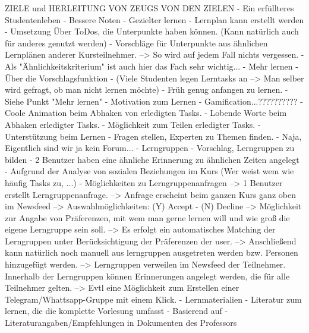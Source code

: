 ZIELE und HERLEITUNG VON ZEUGS VON DEN ZIELEN
 - Ein erfüllteres Studentenleben
    - Bessere Noten
        - Gezielter lernen
            - Lernplan kann erstellt werden
            - Umsetzung Über ToDos, die Unterpunkte haben können. (Kann natürlich auch für anderes genutzt werden)
            - Vorschläge für Unterpunkte aus ähnlichen Lernplänen anderer Kursteilnehmer. --> So wird auf jedem Fall nichts vergessen.
            - Als "Ähnlichkeitskriterium" ist auch hier das Fach sehr wichtig...
        - Mehr lernen
            - Über die Vorschlagsfunktion
            - (Viele Studenten legen Lerntasks an --> Man selber wird gefragt, ob man nicht lernen möchte)
        - Früh genug anfangen zu lernen.
            - Siehe Punkt "Mehr lernen"
        - Motivation zum Lernen
            - Gamification...??????????
            - Coole Animation beim Abhaken von erledigten Tasks.
            - Lobende Worte beim Abhaken erledigter Tasks.
            - Möglichkeit zum Teilen erledigter Tasks.
        - Unterstützung beim Lernen
            - Fragen stellen, Experten zu Themen finden.
                - Naja, Eigentlich sind wir ja kein Forum...
            - Lerngruppen
                - Vorschlag, Lerngruppen zu bilden
                    - 2 Benutzer haben eine ähnliche Erinnerung zu ähnlichen Zeiten angelegt
                    - Aufgrund der Analyse von sozialen Beziehungen im Kurs (Wer weist wem wie häufig Tasks zu, ...)
                - Möglichkeiten zu Lerngruppenanfragen
                    --> 1 Benutzer erstellt Lerngruppenanfrage.
                    --> Anfrage erscheint beim ganzen Kurs ganz oben im Newsfeed
                    --> Auswahlmöglichkeiten: (Y) Accept - (N) Decline
                    --> Möglichkeit zur Angabe von Präferenzen, mit wem man gerne lernen will und wie groß die eigene Lerngruppe sein soll.
                    --> Es erfolgt ein automatisches Matching der Lerngruppen unter Berücksichtigung der Präferenzen der user.
                    --> Anschließend kann natürlich noch manuell aus lerngruppen ausgetreten werden bzw. Personen hinzugefügt werden.
                    --> Lerngruppen verweilen im Newsfeed der Teilnehmer. Innerhalb der Lerngruppen können Erinnerungen angelegt werden, die für alle Teilnehmer gelten.
                    --> Evtl eine Möglichkeit zum Erstellen einer Telegram/Whattsapp-Gruppe mit einem Klick.
            - Lernmaterialien
                - Literatur zum lernen, die die komplette Vorlesung umfasst
                        - Basierend auf
                            - Literaturangaben/Empfehlungen in Dokumenten des Professors
